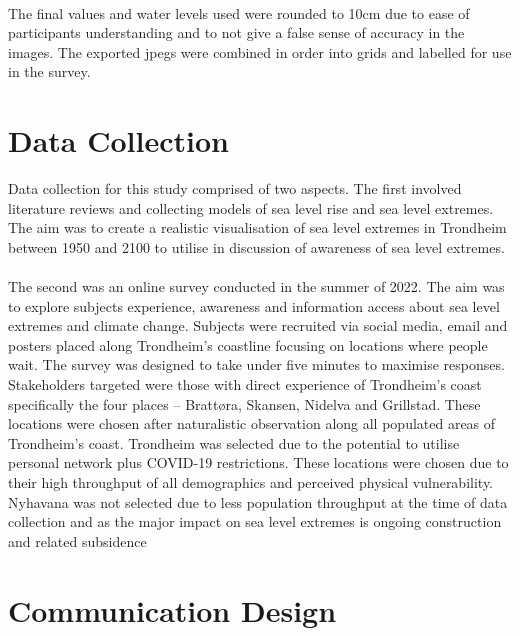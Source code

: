 \paragraph{}
The final values and water levels used were rounded to 10cm due to ease of participants understanding and to not give a false sense of accuracy in the images. The exported jpegs were combined in order into grids and labelled for use in the survey. 



\section{Data Collection}

Data collection for this study comprised of two aspects.  The first involved literature reviews and collecting models of sea level rise and sea level extremes. The aim was to create a realistic visualisation of sea level extremes in Trondheim between 1950 and 2100 to utilise in discussion of awareness of sea level extremes. 
\paragraph{}

The second was an online survey conducted in the summer of 2022. The aim was to explore subjects experience, awareness and information access about sea level extremes and climate change. Subjects were recruited via social media, email and posters placed along Trondheim’s coastline focusing on locations where people wait. The survey was designed to take under five minutes to maximise responses. Stakeholders targeted were those with direct experience of Trondheim’s coast specifically the four places – Brattøra, Skansen, Nidelva and Grillstad. These locations were chosen after naturalistic observation along all populated areas of Trondheim’s coast. Trondheim was selected due to the potential to utilise personal network plus COVID-19 restrictions. These locations were chosen due to their high throughput of all demographics and perceived physical vulnerability. Nyhavana was not selected due to less population throughput at the time of data collection and as the major impact on sea level extremes is ongoing construction and related subsidence \cite{miljoenheten_og_byplankontoret_trondheim_kommune_9-notat-om-havnivastigning-og-stormflo---hensyn-i-arealplanlegging-nyhavnapdf_2020}




\section{Communication Design}

